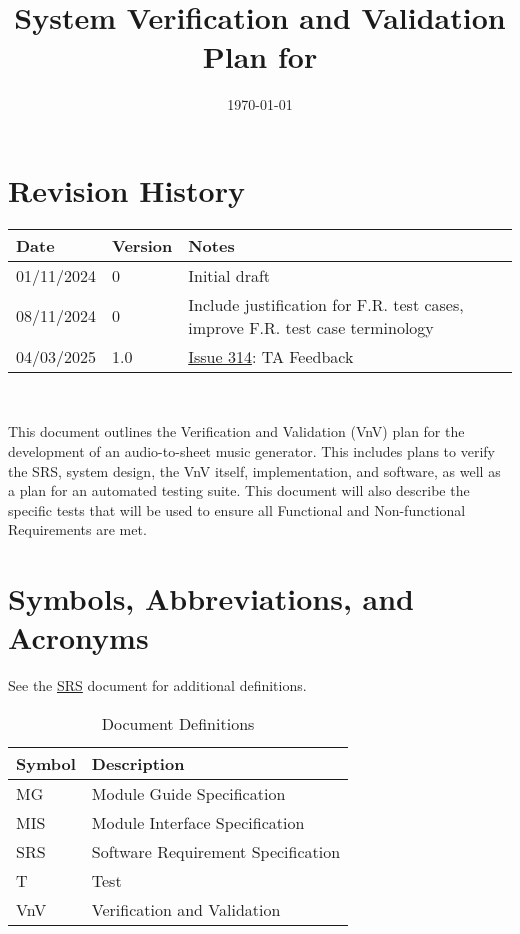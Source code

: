 \documentclass[12pt, titlepage]{article}
\begin{document}
\title{System Verification and Validation Plan for \progname{}} 
\author{\authname}
\date{\today}
	
\maketitle


\section*{Revision History}

\begin{tabularx}{\textwidth}{p{3cm}p{2cm}X}
\toprule {\bf Date} & {\bf Version} & {\bf Notes}\\
\midrule
01/11/2024 & 0 & Initial draft\\
08/11/2024 & 0 & Include justification for F.R. test cases, improve  F.R. test case terminology\\
04/03/2025 & 1.0 & \href{https://github.com/emilyperica/ScoreGen/issues/314}{Issue 314}: TA Feedback\\
\bottomrule
\end{tabularx}

~\\

\newpage

\tableofcontents

\listoftables

\newpage
{}

This document outlines the Verification and Validation (VnV) plan for the development 
of an audio-to-sheet music generator. This includes plans to verify the SRS, system 
design, the VnV itself, implementation, and software, as well as a plan for an automated 
testing suite. This document will also describe the specific tests that will be used to 
ensure all Functional and Non-functional Requirements are met.

\section{Symbols, Abbreviations, and Acronyms}
See the \href{https://github.com/emilyperica/ScoreGen/blob/main/docs/SRS-Volere/SRS.pdf}{SRS} document for additional definitions.

\renewcommand{\arraystretch}{1.2}
\begin{table}[h!]
  \centering
  \caption{Document Definitions}
  \vspace{5pt}
  \begin{tabular}{l l}
    \toprule		
    \textbf{Symbol} & \textbf{Description}\\
    \midrule 
    MG & Module Guide Specification\\
    MIS & Module Interface Specification\\ 
    SRS & Software Requirement Specification\\
    T & Test\\
    VnV & Verification and Validation\\
    \bottomrule
  \end{tabular}
\end{table}
\end{document}
